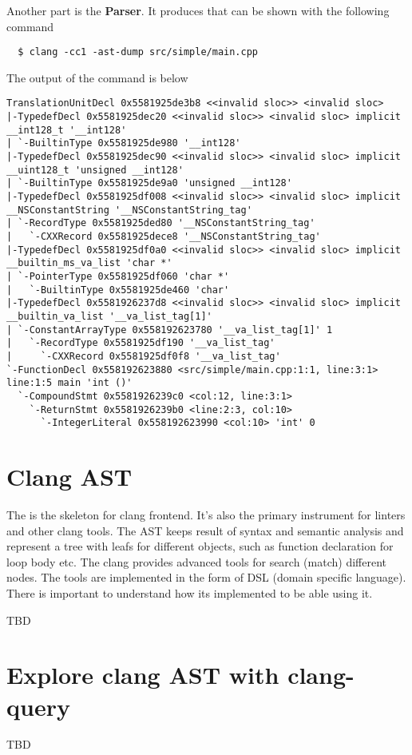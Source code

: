 Another part is the \textbf{Parser}. It produces  that
can be shown with the following command
\begin{verbatim}
  $ clang -cc1 -ast-dump src/simple/main.cpp
  \end{verbatim}
The output of the command is below
\begin{verbatim}
TranslationUnitDecl 0x5581925de3b8 <<invalid sloc>> <invalid sloc>
|-TypedefDecl 0x5581925dec20 <<invalid sloc>> <invalid sloc> implicit __int128_t '__int128'
| `-BuiltinType 0x5581925de980 '__int128'
|-TypedefDecl 0x5581925dec90 <<invalid sloc>> <invalid sloc> implicit __uint128_t 'unsigned __int128'
| `-BuiltinType 0x5581925de9a0 'unsigned __int128'
|-TypedefDecl 0x5581925df008 <<invalid sloc>> <invalid sloc> implicit __NSConstantString '__NSConstantString_tag'
| `-RecordType 0x5581925ded80 '__NSConstantString_tag'
|   `-CXXRecord 0x5581925dece8 '__NSConstantString_tag'
|-TypedefDecl 0x5581925df0a0 <<invalid sloc>> <invalid sloc> implicit __builtin_ms_va_list 'char *'
| `-PointerType 0x5581925df060 'char *'
|   `-BuiltinType 0x5581925de460 'char'
|-TypedefDecl 0x5581926237d8 <<invalid sloc>> <invalid sloc> implicit __builtin_va_list '__va_list_tag[1]'
| `-ConstantArrayType 0x558192623780 '__va_list_tag[1]' 1
|   `-RecordType 0x5581925df190 '__va_list_tag'
|     `-CXXRecord 0x5581925df0f8 '__va_list_tag'
`-FunctionDecl 0x558192623880 <src/simple/main.cpp:1:1, line:3:1> line:1:5 main 'int ()'
  `-CompoundStmt 0x5581926239c0 <col:12, line:3:1>
    `-ReturnStmt 0x5581926239b0 <line:2:3, col:10>
      `-IntegerLiteral 0x558192623990 <col:10> 'int' 0
\end{verbatim}

\section{Clang AST}
The  is the skeleton for clang frontend. It's also the primary
instrument for linters and other clang tools. The AST keeps result of syntax and
semantic analysis and represent a tree with leafs for different objects, such as
function declaration for loop body etc. The clang provides advanced tools for
search (match) different nodes. The tools are implemented in the form of DSL
(domain specific language). There is important to understand how its
implemented to be able using it.

TBD

\section{Explore clang AST with clang-query}

TBD
